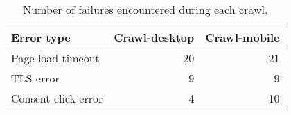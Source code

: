 \begin{table}[ht] 
\caption{Number of failures encountered during each crawl.} 
\centering 
\begin{tabular}{|l|r|r|} 
\hline 
\textbf{Error type} & \multicolumn{1}{l|}{\textbf{Crawl-desktop}} & \multicolumn{1}{l|}{\textbf{Crawl-mobile}} \\ \hline 
Page load timeout & 20 & 21 \\ \hline 
TLS error & 9 & 9 \\ \hline 
Consent click error & 4 & 10 \\ \hline 
\end{tabular} 
\label{table:NumberOfFailures} 
\end{table}